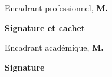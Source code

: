 \thispagestyle{empty}

\begin{center}
    \begin{minipage}[l]{1\columnwidth}
        \begin{tcolorbox}[colback=white,boxrule=5pt,arc=10pt,height=105mm]{
            \vspace{2cm}
            \large \@proSignSentence
            \vspace{1mm}
            \begin{center}
                \Large
                Encadrant professionnel, \textbf{M. }
            \end{center}
            \vspace{5mm}
            \hspace{0.71\columnwidth}\textbf{\large Signature et cachet}
        }
        \end{tcolorbox}
    \end{minipage}
    
    \vspace{2cm}
    
    \begin{minipage}[l]{1\columnwidth}
        \begin{tcolorbox}[colback=white,boxrule=5pt,arc=10pt,height=105mm]{
            \vspace{2cm}
            \large \@academicSignSentence
            \vspace{1mm}
            \begin{center}
                \Large
                Encadrant académique, \textbf{M. }
            \end{center}
            \vspace{5mm}
            \hspace{0.84\columnwidth}\textbf{\large Signature}
        }
        \end{tcolorbox}
    \end{minipage}
\end{center}